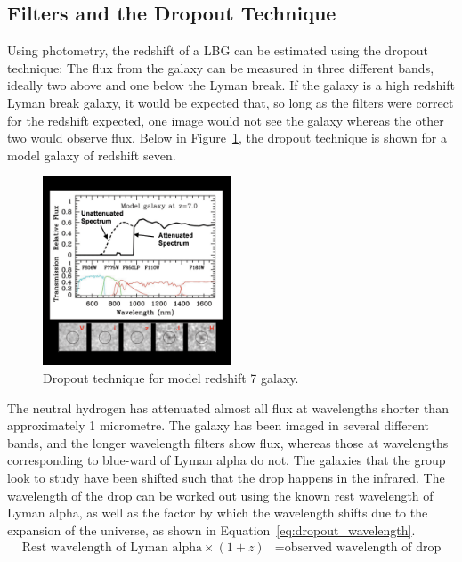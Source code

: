 
	\subsection{Filters and the Dropout Technique} %
		\label{ssub:filters_and_the_dropout_technique}
		Using photometry, the redshift of a LBG can be estimated using the dropout technique: The flux from the galaxy can be measured in three different bands, ideally two above and one below the Lyman break. If the galaxy is a high redshift Lyman break galaxy, it would be expected that, so long as the filters were correct for the redshift expected, one image would not see the galaxy whereas the other two would observe flux. Below in Figure~\ref{fig:drop_out_at_z7}, the dropout technique is shown for a model galaxy of redshift seven.
		\begin{figure}[!htbp]
			\centering
			\includegraphics[width=0.5\textwidth]{../Images/drop_out_at_z7.png}
			\caption{Dropout technique for model redshift 7 galaxy\cite{first_galaxies_dropout_at_z7}.\label{fig:drop_out_at_z7}}
		\end{figure}

		The neutral hydrogen has attenuated almost all flux at wavelengths shorter than approximately 1 micrometre. The galaxy has been imaged in several different bands, and the longer wavelength filters show flux, whereas those at wavelengths corresponding to blue-ward of Lyman alpha do not. The galaxies that the group look to study have been shifted such that the drop happens in the infrared. The wavelength of the drop can be worked out using the known rest wavelength of Lyman alpha, as well as the factor by which the wavelength shifts due to the expansion of the universe, as shown in Equation~\ref{eq:dropout_wavelength}.
		\begin{align}
			\text{Rest wavelength of Lyman alpha} \times (1+z) &= \text{observed wavelength of drop}\label{eq:dropout_wavelength}
		\end{align}

